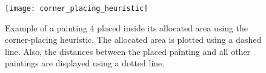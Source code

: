 \begin{figure}[h!]
    \texttt{[image: corner\_placing\_heuristic]}
    \caption[Painting placement example]
    {Example of a painting 4 placed inside its allocated area using the corner-placing heuristic.
    The allocated area is plotted using a dashed line.
    Also, the distances between the placed painting and all other paintings are displayed using a dotted line.}
    \label{fig:corner-placing-heuristic}
\end{figure}
